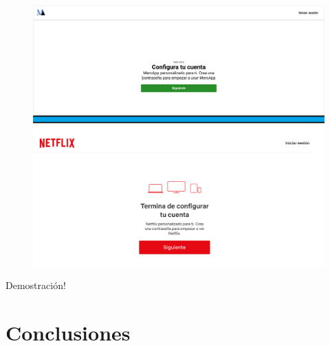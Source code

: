 \documentclass{beamer}
\begin{document}
		\begin{frame}
			\begin{figure}
				\centering
				\includegraphics[width=0.7\linewidth]{../img/infoBenvinguda}
				\label{fig:infobenvinguda}
			\end{figure}
			
		\end{frame}
		
		\begin{frame}

			Demostración!
			
		\end{frame}
	
	
	
	
	
	
	
	
	
	
	
	
	
	
	
	
	
	
	
	
	
	
	
	
	
	
	
	\section{Conclusiones}
	
\end{document}
